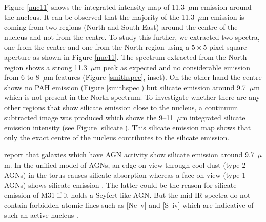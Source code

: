 %
%


Figure \ref{nuc11} shows the integrated intensity map of 11.3~$\mu$m emission around the nucleus. It can be observed that the majority of the 11.3~$\mu$m 
emission is coming from two regions (North and South East) around the centre of the nucleus and not from the centre. To study this further, we extracted two 
spectra, one from the centre and one from the North region using a $5 \times 5$ pixel square aperture as shown in Figure \ref{nuc11}. The spectrum extracted 
from the North region shows a strong 11.3~$\mu$m peak as expected and no considerable emission from 6 to 8~$\mu$m features (Figure \ref{smithspec}, inset). 
On the other hand the centre shows no PAH emission (Figure \ref{smithspec}) but silicate emission around 9.7~$\mu$m which is not present in the North spectrum. 
To investigate whether there are any other regions that show silicate emission close to the nucleus, a continuum subtracted image was produced which shows the 
9--11~$\mu$m integrated silicate emission intensity (see Figure \ref{silicate}). This silicate emission map shows that only the exact centre of the nucleus contributes 
to the silicate emission. 

\citet{Spoon2007} report that galaxies which have AGN activity show silicate emission around 9.7~$\mu$m.
In the unified model of AGNs, an edge on view through cool dust (type 2 AGNs) in the torus causes silicate absorption whereas a face-on view (type 1 AGNs) 
shows silicate emission \citep{AGNtypes1995}. The latter could be the reason for silicate emission of M31 if it holds a Seyfert-like AGN. 
But the mid-IR spectra do not contain forbidden atomic lines such as [Ne~{\sc v}] and [S~{\sc iv}] which are indicative of such an active nucleus \citep{AGNref}.

